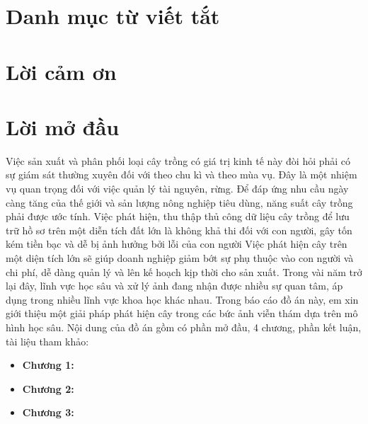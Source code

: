 \documentclass[a4paper, 12pt]{report}
\begin{document}
\tableofcontents{}

\chapter*{Danh mục từ viết tắt}


\listoffigures

\chapter*{Lời cảm ơn}

\chapter*{Lời mở đầu}
Việc sản xuất và phân phối loại cây trồng có giá trị kinh tế này đòi hỏi phải có sự giám sát thường xuyên đối với theo chu kì và theo mùa vụ. Đây là một nhiệm vụ quan trọng đối với việc quản lý tài nguyên, rừng. Để đáp ứng nhu cầu ngày càng tăng của thế giới và sản lượng nông nghiệp tiêu dùng, năng suất cây trồng phải được ước tính. Việc phát hiện, thu thập thủ công dữ liệu cây trồng để lưu trữ hồ sơ trên một diễn tích đất lớn là không khả thi đối với con người, gây tốn kém tiền bạc và dễ bị ảnh hưởng bởi lỗi của con người
Việc phát hiện cây trên một diện tích lớn sẽ giúp doanh nghiệp giảm bớt sự phụ thuộc vào con người và chi phí, dễ dàng quản lý và lên kế hoạch kịp thời cho sản xuất. Trong vài năm trở lại đây, lĩnh vực học sâu và xử lý ảnh đang nhận được nhiều sự quan tâm, áp dụng trong nhiều lĩnh vực khoa học khác nhau. Trong báo cáo đồ án này, em xin giới thiệu một giải pháp phát hiện cây trong các bức ảnh viễn thám dựa trên mô hình học sâu. Nội dung của đồ án gồm có phần mở đầu, 4 chương, phần kết luận, tài liệu tham khảo:
\begin{itemize}
	\item \textbf{Chương 1: }
	
	\item \textbf{Chương 2: }

	\item \textbf{Chương 3: }

\end{itemize}
\end{document}
